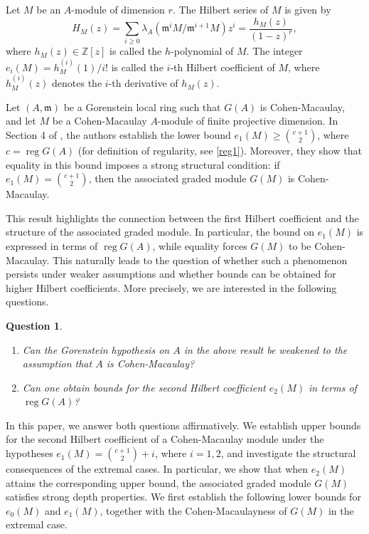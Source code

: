\documentclass[11pt]{amsart}
\theoremstyle{plain}
\newtheorem{question}[theorem]{Question}
\newcommand{\reg}{\operatorname{reg}}
\theoremstyle{plain}
\begin{document}
Let $M$ be an $A$-module of dimension $r$. The Hilbert series of $M$ is given by
$$H_M(z)=\sum_{i\geq 0}\lambda_A(\mathfrak{m}^iM/\mathfrak{m}^{i+1}M)z^i
=\frac{h_M(z)}{(1-z)^r},$$ where $h_M(z)\in\mathbb{Z}[z]$ is called the $h$-polynomial of $M$. The integer
$e_i(M)={h_M^{(i)}(1)}/{i!}$ is called the $i$-th Hilbert coefficient of $M$, where $h_M^{(i)}(z)$ denotes the $i$-th derivative of $h_M(z)$.

Let $(A,\mathfrak{m})$ be a Gorenstein local ring such that $G(A)$ is Cohen-Macaulay, and let $M$ be a Cohen-Macaulay $A$-module of finite projective dimension. In Section 4 of \cite{Quasipure}, the authors establish the lower bound $e_1(M)\geq \binom{c+1}{2}$, where $c=\reg G(A)$ (for definition of regularity, see \ref{reg1}). Moreover, they show that equality in this bound imposes a strong structural condition: if $e_1(M)=\binom{c+1}{2}$, then the associated graded module $G(M)$ is Cohen-Macaulay.

This result highlights the connection between the first Hilbert coefficient and the structure of the associated graded module. In particular, the bound on $e_1(M)$ is expressed in terms of $\reg G(A)$, while equality forces $G(M)$ to be Cohen-Macaulay. This naturally leads to the question of whether such a phenomenon persists under weaker assumptions and whether bounds can be obtained for higher Hilbert coefficients. More precisely, we are interested in the following questions.

\begin{question}
\begin{enumerate}
    \item Can the Gorenstein hypothesis on $A$ in the above result be weakened to the assumption that $A$ is Cohen-Macaulay?
    \item Can one obtain bounds for the second Hilbert coefficient $e_2(M)$ in terms of $\reg G(A)$?
\end{enumerate}
\end{question}

In this paper, we answer both questions affirmatively. We establish upper bounds for the second Hilbert coefficient of a Cohen-Macaulay module under the hypotheses $e_1(M)=\binom{c+1}{2}+i$, where $i=1,2$, and investigate the structural consequences of the extremal cases. In particular, we show that when $e_2(M)$ attains the corresponding upper bound, the associated graded module $G(M)$ satisfies strong depth properties. We first establish the following lower bounds for $e_0(M)$ and $e_1(M)$, together with the Cohen-Macaulayness of $G(M)$ in the extremal case.
\end{document}
